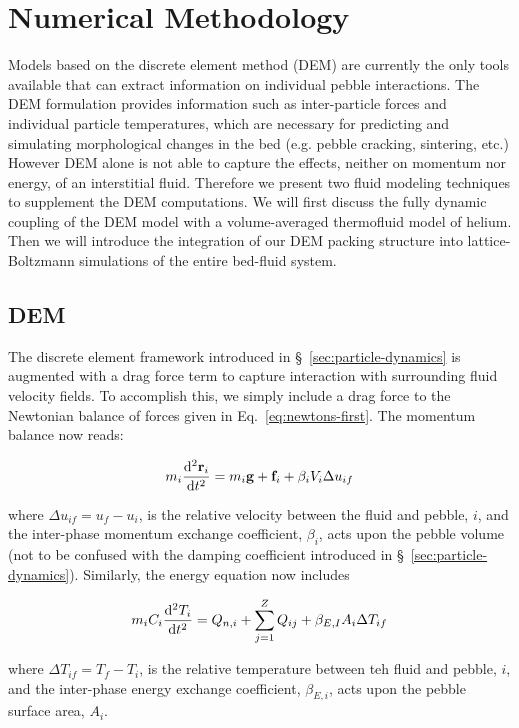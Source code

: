 \section{Numerical Methodology}
Models based on the discrete element method (DEM) are currently the only tools available that can extract information on individual pebble interactions. The DEM formulation provides information such as inter-particle forces and individual particle temperatures, which are necessary for predicting and simulating morphological changes in the bed (e.g. pebble cracking, sintering, etc.) However DEM alone is not able to capture the effects, neither on momentum nor energy, of an interstitial fluid. Therefore we present two fluid modeling techniques to supplement the DEM computations. We will first discuss the fully dynamic coupling of the DEM model with a volume-averaged thermofluid model of helium. Then we will introduce the integration of our DEM packing structure into lattice-Boltzmann simulations of the entire bed-fluid system.

\subsection{DEM}
The discrete element framework introduced in \S~\ref{sec:particle-dynamics} is augmented with a drag force term to capture interaction with surrounding fluid velocity fields. To accomplish this, we simply include a drag force to the Newtonian balance of forces given in Eq.~\ref{eq:newtons-first}. The momentum balance now reads:

\begin{equation}\label{eq:cfdem-dem-momentum}
m_i  \frac{\mathrm{d}^2{\mathbf{r}_i}}{\mathrm{d}t^2} = m_i\mathbf{g} + \mathbf{f}_i + \beta_i V_i \Delta u_{if}
\end{equation}

where $\Delta u_{if} = u_f - u_i$, is the relative velocity between the fluid and pebble, $i$, and the inter-phase momentum exchange coefficient, $\beta_i$, acts upon the pebble volume (not to be confused with the damping coefficient introduced in \S~\ref{sec:particle-dynamics}). Similarly, the energy equation now includes 

\begin{equation}\label{eq:cfdem-dem-energy}
m_iC_i \frac{\mathrm{d}^2{T_i}}{\mathrm{d}t^2} = Q_{n,i} + \sum_{j=1}^Z Q_{ij} + \beta_{E,I} A_i \Delta T_{if}
\end{equation}

where $\Delta T_{if} = T_f - T_i$, is the relative temperature between teh fluid and pebble, $i$, and the inter-phase energy exchange coefficient, $\beta_{E,i}$, acts upon the pebble surface area, $A_i$.

